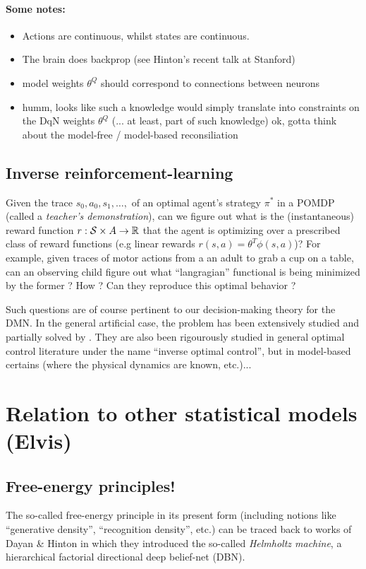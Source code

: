 \documentclass{article} %
\begin{document}
\paragraph*{Some notes:}
\begin{itemize}
  \item Actions are continuous, whilst states are continuous.
  \item The brain does backprop (see Hinton's recent talk at Stanford)
  \item model weights $\theta^Q$ should correspond to connections between neurons
\item humm, looks like such a knowledge would simply translate into constraints on the DqN weights $\theta^Q$ (... at least, part of such knowledge)
  ok, gotta think about the model-free / model-based reconsiliation
\end{itemize}

\subsection{Inverse reinforcement-learning}
\begin{mdframed}
  Given the trace $s_0,a_0,s_1,\ldots,$ of an optimal agent's strategy $\pi^*$ in
  a POMDP (called a \textit{teacher's demonstration}), can we figure out what is the
  (instantaneous) reward function $r: \mathcal S \times \mathcal \mathcal A
  \rightarrow \mathbb R$ that the agent is optimizing over a prescribed class of reward functions
  (e.g linear rewards $r(s,a) = \theta^T\phi(s,a)$)?
  For example, given traces of motor actions from a an adult to grab a cup on a table,
  can an observing child figure out what ``langragian'' functional is being minimized by the former ?
  How ? Can they reproduce this optimal behavior ?
\end{mdframed}

Such questions are of course pertinent to our decision-making theory for the DMN.
In the general artificial case, the problem has been extensively studied and partially solved by
\cite{abbeel2004}. They are also been rigourously studied in general optimal control literature under the name ``inverse optimal control'', but in model-based certains (where the physical dynamics
are known, etc.)...

\section{Relation to other statistical models (Elvis)}
\subsection{Free-energy principles!}
The so-called free-energy principle in its present form (including notions like ``generative density'', ``recognition density'', etc.) can be traced back to works of Dayan \& Hinton \citep{dayan1995helmholtz} in which they introduced the so-called \textit{Helmholtz machine}, a hierarchical factorial directional deep belief-net (DBN).
\end{document}

